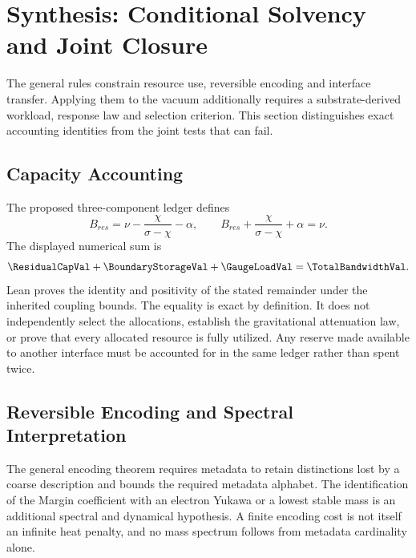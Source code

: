 
\section{Synthesis: Conditional Solvency and Joint Closure}
\label{sec:Synthesis}

The general rules constrain resource use, reversible encoding and interface transfer. Applying them to the vacuum additionally requires a substrate-derived workload, response law and selection criterion. This section distinguishes exact accounting identities from the joint tests that can fail.

\subsection{Capacity Accounting}
The proposed three-component ledger defines
\begin{equation}
 B_{res}=\nu-\frac{\chi}{\sigma-\chi}-\alpha,
 \qquad
 B_{res}+\frac{\chi}{\sigma-\chi}+\alpha=\nu.
\end{equation}
The displayed numerical sum is
\begin{equation}
 \ResidualCapVal+\BoundaryStorageVal+\GaugeLoadVal=\TotalBandwidthVal.
\end{equation}
Lean proves the identity and positivity of the stated remainder under the inherited coupling bounds. The equality is exact by definition. It does not independently select the allocations, establish the gravitational attenuation law, or prove that every allocated resource is fully utilized. Any reserve made available to another interface must be accounted for in the same ledger rather than spent twice.

\subsection{Reversible Encoding and Spectral Interpretation}
The general encoding theorem requires metadata to retain distinctions lost by a coarse description and bounds the required metadata alphabet. The identification of the Margin coefficient with an electron Yukawa or a lowest stable mass is an additional spectral and dynamical hypothesis. A finite encoding cost is not itself an infinite heat penalty, and no mass spectrum follows from metadata cardinality alone.


